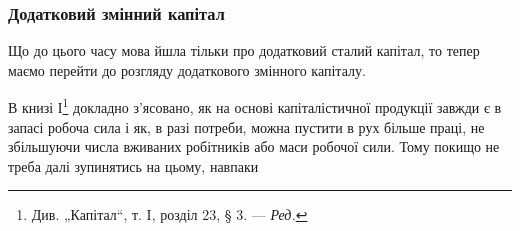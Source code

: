 \subsubsection{Додатковий змінний капітал}

Що до цього часу мова йшла тільки про додатковий сталий капітал,
то тепер маємо перейти до розгляду додаткового змінного
капіталу.

В книзі І\footnote*{
Див. „Капітал“, т. I, розділ 23, § 3. — \emph{Ред.}
} докладно з’ясовано, як на основі капіталістичної продукції
завжди є в запасі робоча сила і як, в разі потреби, можна пустити
в рух більше праці, не збільшуючи числа вживаних робітників або маси
робочої сили. Тому покищо не треба далі зупинятись на цьому, навпаки
\parbreak{}  %
